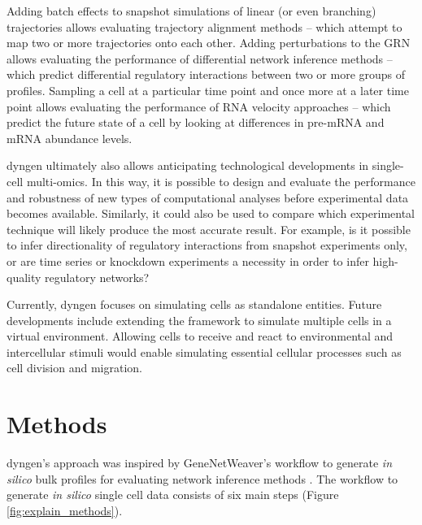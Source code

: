 Adding batch effects to snapshot simulations of linear (or even branching) trajectories allows evaluating trajectory alignment methods -- which attempt to map two or more trajectories onto each other. Adding perturbations to the GRN allows evaluating the performance of differential network inference methods -- which predict differential regulatory interactions between two or more groups of profiles.  Sampling a cell at a particular time point and once more at a later time point allows evaluating the performance of RNA velocity approaches -- which predict the future state of a cell by looking at differences in pre-mRNA and mRNA abundance levels.

dyngen ultimately also allows anticipating technological developments in single-cell multi-omics. In this way, it is possible to design and evaluate the performance and robustness of new types of computational analyses before experimental data becomes available.
Similarly, it could also be used to compare which experimental technique will likely produce the most accurate result. For example, is it possible to infer directionality of regulatory interactions from snapshot experiments only, or are time series or knockdown experiments a necessity in order to infer high-quality regulatory networks?

Currently, dyngen focuses on simulating cells as standalone entities.
Future developments include extending the framework to simulate multiple cells in a virtual environment. Allowing cells to receive and react to environmental and intercellular stimuli would enable simulating essential cellular processes such as cell division and migration. 
\section{Methods}

dyngen's approach was inspired by GeneNetWeaver's \cite{schaffter_genenetweaversilicobenchmark_2011} workflow to generate \textit{in silico} bulk profiles for evaluating network inference methods \cite{marbach_wisdomcrowdsrobust_2012}. The workflow to generate \textit{in silico} single cell data consists of six main steps (Figure \ref{fig:explain_methods}). 

